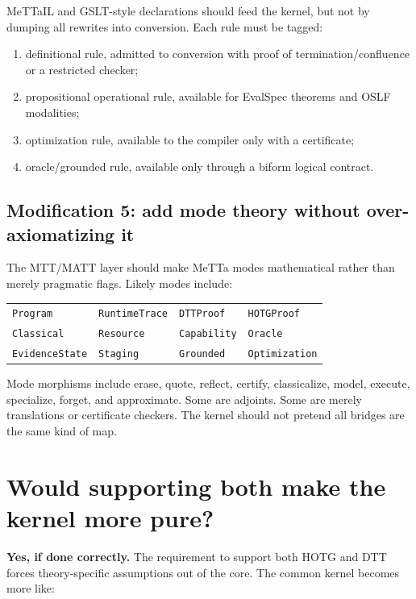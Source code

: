 \documentclass[11pt]{article}
\newcommand{\MeTTa}{\textup{MeTTa}}
\newcommand{\MeTTaIL}{\textup{MeTTaIL}}
\newcommand{\HOTG}{\textup{HOTG}}
\newcommand{\DTT}{\textup{DTT}}
\newcommand{\MTT}{\textup{MTT}}
\newcommand{\MATT}{\textup{MATT}}
\newcommand{\OSLF}{\textup{OSLF}}
\newcommand{\code}[1]{\texttt{#1}}
\begin{document}
\MeTTaIL{} and GSLT-style declarations should feed the kernel, but not by dumping all rewrites into conversion.  Each rule must be tagged:

\begin{enumerate}
\item definitional rule, admitted to conversion with proof of termination/confluence or a restricted checker;
\item propositional operational rule, available for EvalSpec theorems and \OSLF{} modalities;
\item optimization rule, available to the compiler only with a certificate;
\item oracle/grounded rule, available only through a biform logical contract.
\end{enumerate}

\subsection{Modification 5: add mode theory without over-axiomatizing it}

The \MTT{}/\MATT{} layer should make \MeTTa{} modes mathematical rather than merely pragmatic flags.  Likely modes include:
\begin{center}
\begin{tabular}{llll}
\code{Program} & \code{RuntimeTrace} & \code{DTTProof} & \code{HOTGProof} \\
\code{Classical} & \code{Resource} & \code{Capability} & \code{Oracle} \\
\code{EvidenceState} & \code{Staging} & \code{Grounded} & \code{Optimization}
\end{tabular}
\end{center}

Mode morphisms include erase, quote, reflect, certify, classicalize, model, execute, specialize, forget, and approximate.  Some are adjoints.  Some are merely translations or certificate checkers.  The kernel should not pretend all bridges are the same kind of map.

\section{Would supporting both make the kernel more pure?}

\textbf{Yes, if done correctly.}  The requirement to support both \HOTG{} and \DTT{} forces theory-specific assumptions out of the core.  The common kernel becomes more like:
\end{document}
